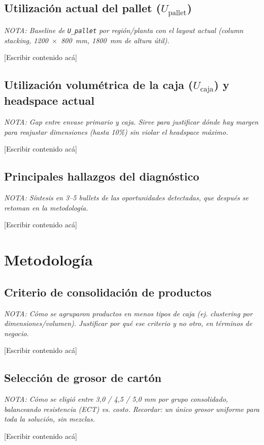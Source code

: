 \documentclass[11pt]{article}
\newcommand{\nota}[1]{{\itshape\color{notegray}\small NOTA: #1}\par\vspace{2pt}}
\newcommand{\placeholder}{\color{placeholdergray}[Escribir contenido acá]\color{black}\par\vspace{6pt}}
\begin{document}
\subsection{Utilización actual del pallet (\texorpdfstring{$U_{\text{pallet}}$}{U\_pallet})}
\nota{Baseline de \texttt{U\_pallet} por región/planta con el layout actual (column stacking, 1200~$\times$~800~mm, 1800~mm de altura útil).}
\placeholder

\subsection{Utilización volumétrica de la caja (\texorpdfstring{$U_{\text{caja}}$}{U\_caja}) y headspace actual}
\nota{Gap entre envase primario y caja. Sirve para justificar dónde hay margen para reajustar dimensiones (hasta 10\%) sin violar el headspace máximo.}
\placeholder

\subsection{Principales hallazgos del diagnóstico}
\nota{Síntesis en 3--5 bullets de las oportunidades detectadas, que después se retoman en la metodología.}
\placeholder

\section{Metodología}

\subsection{Criterio de consolidación de productos}
\nota{Cómo se agruparon productos en menos tipos de caja (ej. clustering por dimensiones/volumen). Justificar por qué ese criterio y no otro, en términos de negocio.}
\placeholder

\subsection{Selección de grosor de cartón}
\nota{Cómo se eligió entre 3,0 / 4,5 / 5,0 mm por grupo consolidado, balanceando resistencia (ECT) vs. costo. Recordar: un único grosor uniforme para toda la solución, sin mezclas.}
\placeholder
\end{document}
